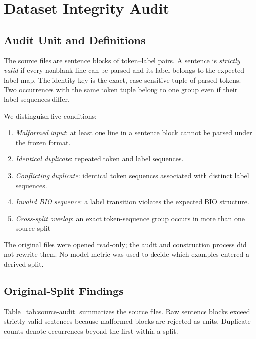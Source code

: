 \documentclass[conference]{IEEEtran}
\begin{document}
\section{Dataset Integrity Audit}
\subsection{Audit Unit and Definitions}
The source files are sentence blocks of token--label pairs. A sentence is \emph{strictly valid} if every nonblank line can be parsed and its label belongs to the expected label map. The identity key is the exact, case-sensitive tuple of parsed tokens. Two occurrences with the same token tuple belong to one group even if their label sequences differ.

We distinguish five conditions:

\begin{enumerate}
    \item \emph{Malformed input}: at least one line in a sentence block cannot be parsed under the frozen format.
    \item \emph{Identical duplicate}: repeated token and label sequences.
    \item \emph{Conflicting duplicate}: identical token sequences associated with distinct label sequences.
    \item \emph{Invalid BIO sequence}: a label transition violates the expected BIO structure.
    \item \emph{Cross-split overlap}: an exact token-sequence group occurs in more than one source split.
\end{enumerate}

The original files were opened read-only; the audit and construction process did not rewrite them. No model metric was used to decide which examples entered a derived split.

\subsection{Original-Split Findings}
Table~\ref{tab:source-audit} summarizes the source files. Raw sentence blocks exceed strictly valid sentences because malformed blocks are rejected as units. Duplicate counts denote occurrences beyond the first within a split.
\end{document}
